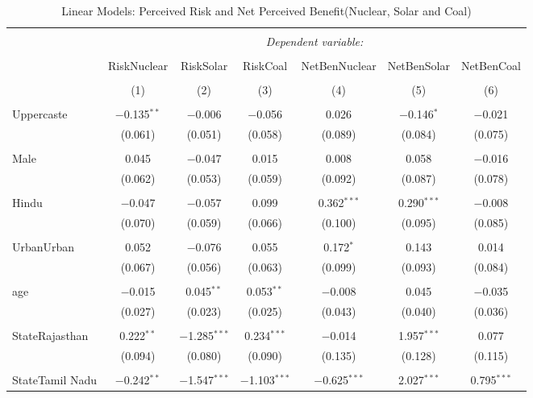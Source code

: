 \documentclass[
]{article}
\begin{document}
\begin{landscape}
\begin{table}[!htbp] \centering 
  \caption{Linear Models: Perceived Risk and Net Perceived Benefit(Nuclear, Solar and Coal)} 
  \label{} 
\begin{tabular}{@{\extracolsep{5pt}}lcccccc} 
\\[-1.8ex]\hline 
\hline \\[-1.8ex] 
 & \multicolumn{6}{c}{\textit{Dependent variable:}} \\ 
\cline{2-7} 
\\[-1.8ex] & RiskNuclear & RiskSolar & RiskCoal & NetBenNuclear & NetBenSolar & NetBenCoal \\ 
\\[-1.8ex] & (1) & (2) & (3) & (4) & (5) & (6)\\ 
\hline \\[-1.8ex] 
 Uppercaste & $-$0.135$^{**}$ & $-$0.006 & $-$0.056 & 0.026 & $-$0.146$^{*}$ & $-$0.021 \\ 
  & (0.061) & (0.051) & (0.058) & (0.089) & (0.084) & (0.075) \\ 
  & & & & & & \\ 
 Male & 0.045 & $-$0.047 & 0.015 & 0.008 & 0.058 & $-$0.016 \\ 
  & (0.062) & (0.053) & (0.059) & (0.092) & (0.087) & (0.078) \\ 
  & & & & & & \\ 
 Hindu & $-$0.047 & $-$0.057 & 0.099 & 0.362$^{***}$ & 0.290$^{***}$ & $-$0.008 \\ 
  & (0.070) & (0.059) & (0.066) & (0.100) & (0.095) & (0.085) \\ 
  & & & & & & \\ 
 UrbanUrban & 0.052 & $-$0.076 & 0.055 & 0.172$^{*}$ & 0.143 & 0.014 \\ 
  & (0.067) & (0.056) & (0.063) & (0.099) & (0.093) & (0.084) \\ 
  & & & & & & \\ 
 age & $-$0.015 & 0.045$^{**}$ & 0.053$^{**}$ & $-$0.008 & 0.045 & $-$0.035 \\ 
  & (0.027) & (0.023) & (0.025) & (0.043) & (0.040) & (0.036) \\ 
  & & & & & & \\ 
 StateRajasthan & 0.222$^{**}$ & $-$1.285$^{***}$ & 0.234$^{***}$ & $-$0.014 & 1.957$^{***}$ & 0.077 \\ 
  & (0.094) & (0.080) & (0.090) & (0.135) & (0.128) & (0.115) \\ 
  & & & & & & \\ 
 StateTamil Nadu & $-$0.242$^{**}$ & $-$1.547$^{***}$ & $-$1.103$^{***}$ & $-$0.625$^{***}$ & 2.027$^{***}$ & 0.795$^{***}$ \\ 

\end{tabular}
\end{table}
\end{landscape}
\end{document}
